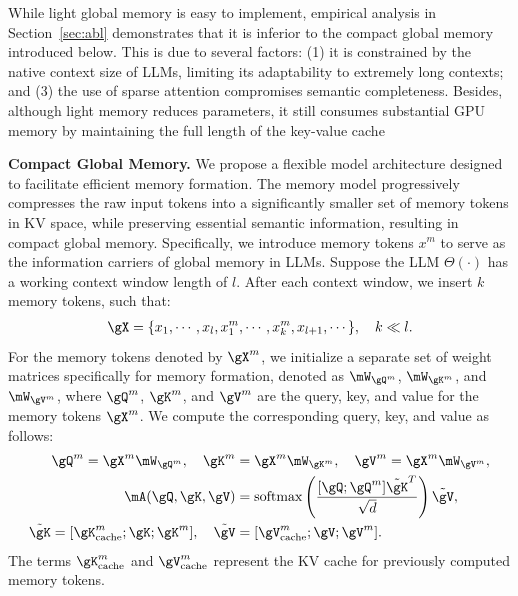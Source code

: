 \documentclass[sigconf]{acmart}
\begin{document}
While light global memory is easy to implement, empirical analysis in Section~\ref{sec:abl} demonstrates that it is inferior to the compact global memory introduced below. This is due to several factors: (1) it is constrained by the native context size of LLMs, limiting its adaptability to extremely long contexts; and (3) the use of sparse attention compromises semantic completeness. Besides, although light memory reduces parameters, it still consumes substantial GPU memory by maintaining the full length of the key-value cache

\textbf{Compact Global Memory.}
We propose a flexible model architecture designed to facilitate efficient memory formation. The memory model progressively compresses the raw input tokens into a significantly smaller set of memory tokens in KV space, while preserving essential semantic information, resulting in compact global memory.
Specifically, we introduce memory tokens $x^m$ to serve as the information carriers of global memory in LLMs. Suppose the LLM $\Theta(\cdot)$ has a working context window length of $l$. After each context window, we insert $k$ memory tokens, such that:
\begin{align}
\gX = \{x_1, \cdots, x_l, x^m_1, \cdots, x^m_k, x_{l+1}, \cdots\}, \quad k \ll l.
\end{align}
For the memory tokens denoted by $\gX^m$, we initialize a separate set of weight matrices specifically for memory formation, denoted as $\mW_{\gQ^m}$, $\mW_{\gK^m}$, and $\mW_{\gV^m}$, where $\gQ^m$, $\gK^m$, and $\gV^m$ are the query, key, and value for the memory tokens $\gX^m$. We compute the corresponding query, key, and value as follows:
\begin{align}
\gQ^m = \gX^m \mW_{\gQ^m}, \quad \gK^m &= \gX^m \mW_{\gK^m}, \quad \gV^m = \gX^m \mW_{\gV^m}, \\
\mA(\gQ, \gK, \gV) &= \text{softmax}\left(\frac{[\gQ;\gQ^m] \tilde{\gK}^T}{\sqrt{d}}\right) \tilde{\gV},\\
\tilde{\gK} = [\gK^m_{\text{cache}};\gK;\gK^m], \quad \tilde{\gV} &= [\gV^m_{\text{cache}}; \gV; \gV^m].
\label{eq:memory}
\end{align}
The terms $\gK^m_{\text{cache}}$ and $\gV^m_{\text{cache}}$ represent the KV cache for previously computed memory tokens.
\end{document}

